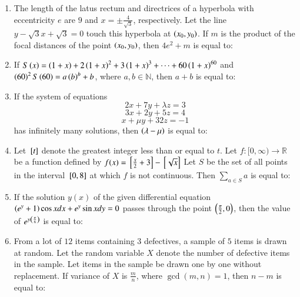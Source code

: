 \documentclass[journal]{IEEEtran}
\begin{document}
\begin{enumerate}[start=16]
\item The length of the latus rectum and directrices of a hyperbola with eccentricity $e$ are $9$ and $x=\pm\frac{4}{\sqrt{3}}$, respectively. Let the line $y-\sqrt{3}x+\sqrt{3}=0$ touch this hyperbola at $\left(x_{0},y_{0}\right)$. If $m$ is the product of the focal distances of the point $\left(x_{0},y_{0}\right)$, then $4e^{2}+m$ is equal to:
\item If $S\left(x\right)=\left(1+x\right)+2\left(1+x\right)^{2}+3\left(1+x\right)^{3}+\cdots+60\left(1+x\right)^{60}$ and $\left(60\right)^2 S\left(60\right)=a\left(b\right)^{b}+b$, where $a, b\in\mathbb{N}$, then $a+b$ is equal to:
\item If the system of equations
\[2x+7y+\lambda z=3\]
\[3x+2y+5z=4\]
\[x+\mu y+32z=-1\]
has infinitely many solutions, then $\left(\lambda-\mu\right)$ is equal to:
\item Let ${}\left[t\right]$ denote the greatest integer less than or equal to $t$. Let $f:[0,\infty)\rightarrow \mathbb{R}$ be a function defined by
$f(x)={}\left[\frac{x}{2}+3\right]-{}\left[\sqrt{x}\right]$
Let $S$ be the set of all points in the interval ${}\left[0, 8\right]$ at which $f$ is not continuous. Then $\displaystyle \sum_{a\in S}a$ is equal to:
\item If the solution $y(x)$ of the given differential equation $\left(e^{y}+1\right)\cos x dx+e^{y}\sin x dy=0$ passes through the point $\left(\frac{\pi}{2},0\right)$, then the value of $e^{y\left(\frac{\pi}{6}\right)}$ is equal to:
\item From a lot of $12$ items containing $3$ defectives, a sample of $5$ items is drawn at random. Let the random variable $X$ denote the number of defective items in the sample. Let items in the sample be drawn one by one without replacement. If variance of $X$ is $\frac{m}{n}$, where $\gcd(m,n)=1$, then $n-m$ is equal to:
\end{enumerate}
\end{document}
